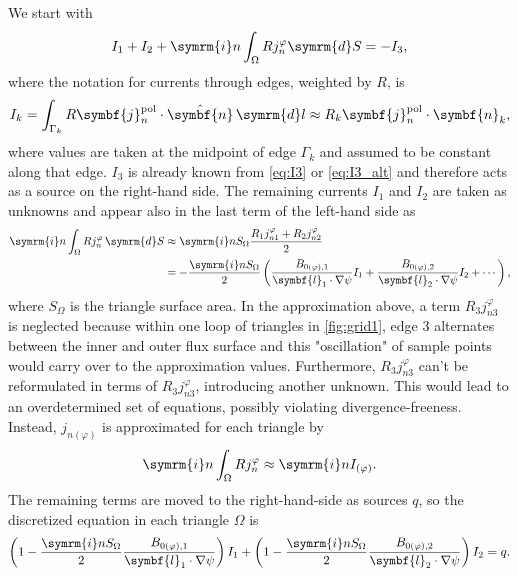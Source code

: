\documentclass[a4paper, 10pt, english]{article}
\let\temp\vartheta
\let\vartheta\theta
\let\theta\temp
\let\temp\varphi
\let\varphi\phi
\let\phi\temp
\let\vec\symbf
\newcommand*\diff{\ensuremath{\symrm{d}}}
\newcommand*\im{\ensuremath{\symrm{i}}}
\newcommand*\pol{\ensuremath{\textrm{pol}}}
\begin{document}
We start with
\begin{gather}
  I_{1} + I_{2} + \im n \int_{\Omega} R j_{n}^{\phi} \diff S = -I_{3},
\end{gather}
where the notation for currents through edges, weighted by $R$, is
\begin{gather}
  I_{k} = \int_{\Gamma_{k}} R \vec{j}_{n}^{\pol} \cdot \hat{\vec{n}} \, \diff l \approx R_{k} \vec{j}_{n}^{\pol} \cdot \vec{n}_{k},
\end{gather}
where values are taken at the midpoint of edge $\Gamma_{k}$ and assumed to be constant along that edge. $I_{3}$ is already known from \cref{eq:I3} or \cref{eq:I3_alt}
and therefore acts as a source on the right-hand side. The remaining currents $I_{1}$ and $I_{2}$ are taken as unknowns and appear also in the last term of the left-hand side as
\begin{align}
  \im n \int_{\Omega} R j_{n}^{\phi} \, \diff S & \approx \im n S_{\Omega} \frac{R_{1} j_{n 1}^{\phi} + R_{2} j_{n 2}^{\phi}}{2} \nonumber \\
  &= -\frac{\im n S_{\Omega}}{2} \left( \frac{B_{0 (\phi), 1}}{\vec{l}_{1} \cdot \nabla \psi} I_{1} + \frac{B_{0 (\phi), 2}}{\vec{l}_{2} \cdot \nabla \psi} I_{2} + \dotsb \right),
\end{align}
where $S_{\Omega}$ is the triangle surface area. In the approximation above, a term $R_{3} j_{n 3}^{\phi}$ is neglected because within one loop of triangles in \cref{fig:grid1}, edge 3 alternates between the inner and outer flux surface and this "oscillation" of sample points would carry over to the approximation values. Furthermore, $R_{3} j_{n 3}^{\phi}$ can't be reformulated in terms of $R_{3} j_{n 3}^{\phi}$, introducing another unknown. This would lead to an overdetermined set of equations, possibly violating divergence-freeness. Instead, $j_{n (\phi)}$ is approximated for each triangle by
\begin{gather}
  \im n \int_{\Omega} R j_{n}^{\phi} \approx \im n I_{(\phi)}.
\end{gather}
The remaining terms are moved to the right-hand-side as sources $q$, so the discretized equation in each triangle $\Omega$ is
\begin{gather}
  \left( 1 - \frac{\im n S_{\Omega}}{2} \frac{B_{0 (\phi), 1}}{\vec{l}_{1} \cdot \nabla \psi} \right) I_{1} + \left( 1 - \frac{\im n S_{\Omega}}{2} \frac{B_{0 (\phi), 2}}{\vec{l}_{2} \cdot \nabla \psi} \right) I_{2} = q. \label{eq:I1I2}
\end{gather}
\end{document}
